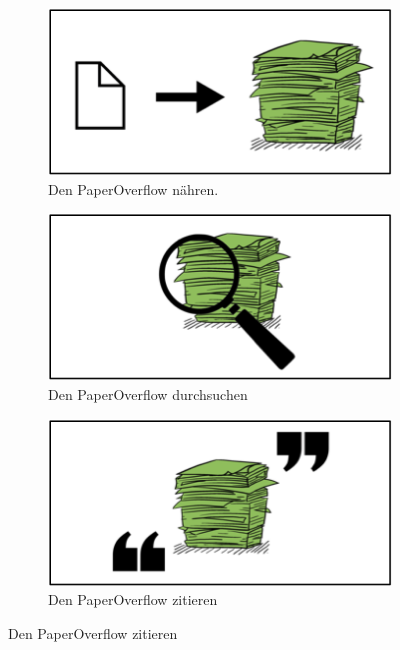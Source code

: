 \documentclass[a4paper,12pt]{article}
\begin{document}
\renewcommand\thesubfigure{\thefigure}
\begin{figure}[h!]
  \centering
  \begin{subfigure}[b]{0.32\linewidth}
    \includegraphics[width=\linewidth]{res/step1.png}
    \caption{Den PaperOverflow nähren.}
  \end{subfigure}
  \begin{subfigure}[b]{0.32\linewidth}
    \includegraphics[width=\linewidth]{res/step2.png}
    \caption{Den PaperOverflow durchsuchen}
  \end{subfigure}
  \begin{subfigure}[b]{0.32\linewidth}
    \includegraphics[width=\linewidth]{res/step3.png}
    \caption{Den PaperOverflow zitieren}
  \end{subfigure}
\end{figure}
\end{document}
